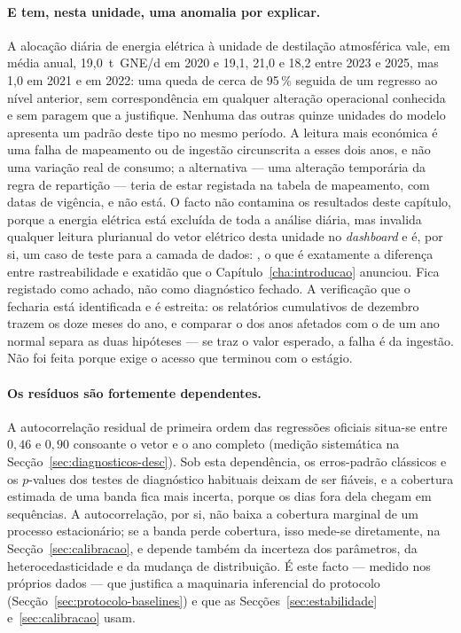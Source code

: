 \paragraph{E tem, nesta unidade, uma anomalia por explicar.} A alocação
diária de energia elétrica à unidade de destilação atmosférica vale, em
média anual, 19,0~t~GNE/d em 2020 e 19,1, 21,0 e 18,2 entre 2023 e 2025,
mas 1,0 em 2021 e em 2022: uma queda de cerca de 95\,\% seguida de um
regresso ao nível anterior, sem correspondência em qualquer alteração
operacional conhecida e sem paragem que a justifique. Nenhuma das outras
quinze unidades do modelo apresenta um padrão deste tipo no mesmo período.
A leitura mais económica é uma falha de mapeamento ou de ingestão
circunscrita a esses dois anos, e não uma variação real de consumo; a
alternativa --- uma alteração temporária da regra de repartição ---
teria de estar registada na tabela de mapeamento, com datas de vigência,
e não está. O facto não contamina os resultados deste capítulo, porque a
energia elétrica está excluída de toda a análise diária, mas invalida
qualquer leitura plurianual do vetor elétrico desta unidade no
\emph{dashboard} e é, por si, um caso de teste para a camada de dados: , o que é exatamente
a diferença entre rastreabilidade e exatidão que o
Capítulo~\ref{cha:introducao} anunciou. Fica registado como achado, não
como diagnóstico fechado. A verificação que o fecharia está identificada e
é estreita: os relatórios cumulativos de dezembro trazem os doze meses do
ano, e comparar o dos anos afetados com o de um ano normal separa as duas
hipóteses ---  se traz o valor esperado, a falha é da ingestão. Não foi
feita porque exige o acesso que terminou com o estágio.


\paragraph{Os resíduos são fortemente dependentes.} A autocorrelação residual
de primeira ordem das regressões oficiais situa-se entre $0{,}46$ e $0{,}90$
consoante o vetor e o ano completo (medição sistemática na
Secção~\ref{sec:diagnosticos-desc}). Sob esta dependência, os erros-padrão clássicos e
os $p$-values dos testes de diagnóstico habituais deixam de ser fiáveis, e a
cobertura estimada de uma banda fica mais incerta, porque os dias fora dela
chegam em sequências. A autocorrelação, por si, não baixa a cobertura
marginal de um processo estacionário; se a banda perde cobertura, isso
mede-se diretamente, na Secção~\ref{sec:calibracao}, e depende também da
incerteza dos parâmetros, da heterocedasticidade e da mudança de
distribuição. É este facto --- medido nos próprios dados --- que
justifica a maquinaria inferencial do protocolo
(Secção~\ref{sec:protocolo-baselines}) e que as Secções~\ref{sec:estabilidade}
e~\ref{sec:calibracao} usam.

